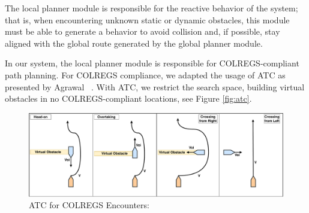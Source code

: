             The local planner module is responsible for the reactive behavior of the system; that is, when encountering unknown static or dynamic obstacles, this module must be able to generate a behavior to avoid collision and, if possible, stay aligned with the global route generated by the global planner module.
        
            In our system, the local planner module is responsible for COLREGS-compliant path planning. For COLREGS compliance, we adapted the usage of \ac{ATC} as presented by Agrawal \etal~\cite{Agrawal2015COLREGS}. With \ac{ATC}, we restrict the search space, building virtual obstacles in no COLREGS-compliant locations, see Figure \ref{fig:atc}.
            
            \begin{figure}[H]
            \centering
            \includegraphics[scale=0.32]{figs/Chap4/atc.pdf}
            \caption{\ac{ATC} for COLREGS Encounters: }
            \label{fig:gnc_arch}
        \end{figure}
        
